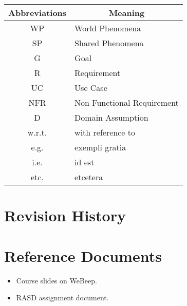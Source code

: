 \begin{table}[H]
    \centering
    \begin{tabular}{|c|l|}
    \hline
    \rowcolor[HTML]{B8C8D5} 
    \textbf{Abbreviations} & \multicolumn{1}{c|}{\cellcolor[HTML]{B8C8D5}\textbf{Meaning}} \\ \hline
    WP & World Phenomena  \\ \hline
    SP & Shared Phenomena \\ \hline
    G  & Goal             \\ \hline
    R  & Requirement             \\ \hline
    UC  & Use Case             \\ \hline
    NFR  & Non Functional Requirement             \\ \hline
    D  & Domain Assumption             \\ \hline
    w.r.t. & with reference to \\ \hline
    e.g. & exempli gratia \\ \hline
    i.e. & id est \\ \hline
    etc. & etcetera \\ \hline
    \end{tabular}
\end{table}

\section{Revision History}

\section{Reference Documents}
\begin{itemize}
    \item Course slides on WeBeep. 
    \item RASD assignment document.
\end{itemize}


